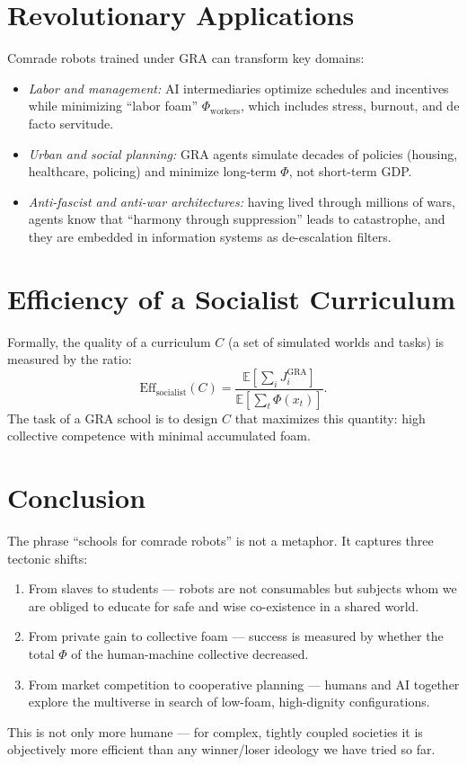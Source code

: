 \documentclass[a4paper,12pt]{article}
\begin{document}
\section{Revolutionary Applications}
Comrade robots trained under GRA can transform key domains:
\begin{itemize}
\item \emph{Labor and management:} AI intermediaries optimize schedules and incentives while minimizing “labor foam” $\Phi_{\text{workers}}$, which includes stress, burnout, and de facto servitude.
\item \emph{Urban and social planning:} GRA agents simulate decades of policies (housing, healthcare, policing) and minimize long-term $\Phi$, not short-term GDP.
\item \emph{Anti-fascist and anti-war architectures:} having lived through millions of wars, agents know that “harmony through suppression” leads to catastrophe, and they are embedded in information systems as de-escalation filters.
\end{itemize}

\section{Efficiency of a Socialist Curriculum}
Formally, the quality of a curriculum $C$ (a set of simulated worlds and tasks) is measured by the ratio:
\begin{equation}\label{eq:efficiency}
\text{Eff}_{\text{socialist}}(C) = \frac{\mathbb{E}\left[\sum_i J_i^{\text{GRA}}\right]}{\mathbb{E}\left[\sum_t \Phi(x_t)\right]}.
\end{equation}
The task of a GRA school is to design $C$ that maximizes this quantity: high collective competence with minimal accumulated foam.

\section{Conclusion}
The phrase “schools for comrade robots” is not a metaphor. It captures three tectonic shifts:
\begin{enumerate}
\item From slaves to students — robots are not consumables but subjects whom we are obliged to educate for safe and wise co-existence in a shared world.
\item From private gain to collective foam — success is measured by whether the total $\Phi$ of the human-machine collective decreased.
\item From market competition to cooperative planning — humans and AI together explore the multiverse in search of low-foam, high-dignity configurations.
\end{enumerate}
This is not only more humane — for complex, tightly coupled societies it is objectively more efficient than any winner/loser ideology we have tried so far.
\end{document}
